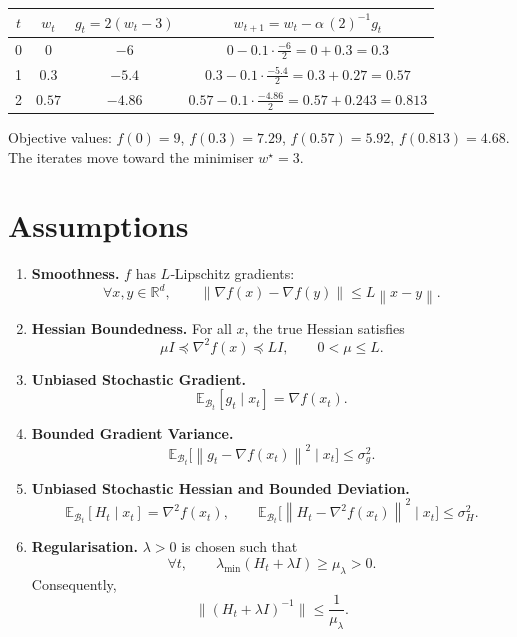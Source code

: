 \documentclass{article}
\newcommand{\E}{\mathbb{E}}
\newcommand{\R}{\mathbb{R}}
\newcommand{\norm}[1]{\left\|#1\right\|}
\begin{document}
\begin{center}
\begin{tabular}{c|c|c|c}
$t$ & $w_{t}$ & $g_{t}=2(w_{t}-3)$ & $w_{t+1}=w_{t}-\alpha\, (2)^{-1} g_{t}$ \\ \hline
0 & $0$ & $-6$ & $0-0.1\cdot\frac{-6}{2}=0+0.3=0.3$ \\
1 & $0.3$ & $-5.4$ & $0.3-0.1\cdot\frac{-5.4}{2}=0.3+0.27=0.57$ \\
2 & $0.57$ & $-4.86$ & $0.57-0.1\cdot\frac{-4.86}{2}=0.57+0.243=0.813$ \\
\end{tabular}
\end{center}

Objective values: $f(0)=9$, $f(0.3)=7.29$, $f(0.57)=5.92$, $f(0.813)=4.68$.  
The iterates move toward the minimiser $w^{\star}=3$.

\newpage
\section*{Assumptions}
\begin{enumerate}
\item \textbf{Smoothness.} $f$ has $L$‑Lipschitz gradients:
\[
\forall x,y\in\R^{d},\qquad \norm{\nabla f(x)-\nabla f(y)}\le L\norm{x-y}. \tag{A1}
\]

\item \textbf{Hessian Boundedness.} For all $x$, the true Hessian satisfies
\[
\mu I \preceq \nabla^{2}f(x) \preceq L I ,\qquad 0<\mu\le L. \tag{A2}
\]

\item \textbf{Unbiased Stochastic Gradient.}
\[
\E_{\mathcal{B}_{t}}[g_{t}\mid x_{t}]=\nabla f(x_{t}). \tag{A3}
\]

\item \textbf{Bounded Gradient Variance.}
\[
\E_{\mathcal{B}_{t}}\big[\norm{g_{t}-\nabla f(x_{t})}^{2}\mid x_{t}\big]\le\sigma_{g}^{2}. \tag{A4}
\]

\item \textbf{Unbiased Stochastic Hessian and Bounded Deviation.}
\[
\E_{\mathcal{B}_{t}}[H_{t}\mid x_{t}]=\nabla^{2}f(x_{t}),\qquad
\E_{\mathcal{B}_{t}}\big[\norm{H_{t}-\nabla^{2}f(x_{t})}^{2}\mid x_{t}\big]\le\sigma_{H}^{2}. \tag{A5}
\]

\item \textbf{Regularisation.} $\lambda>0$ is chosen such that
\[
\forall t,\qquad \lambda_{\min}(H_{t}+\lambda I)\ge \mu_{\lambda}>0 . \tag{A6}
\]
Consequently,
\[
\|(H_{t}+\lambda I)^{-1}\|\le \frac{1}{\mu_{\lambda}} . \tag{A7}
\]
\end{enumerate}
\end{document}
